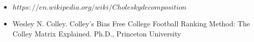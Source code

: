 \begin{itemize}
\item $https://en.wikipedia.org/wiki/Choleskydecomposition$
\item Wesley N. Colley. Colley’s Bias Free College Football Ranking Method: The Colley Matrix Explained.
Ph.D., Princeton University
\end{itemize}


